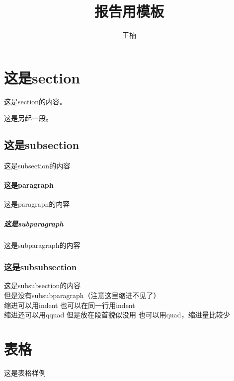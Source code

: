 \documentclass{article} %
\begin{document}
\begin{CJK}{UTF8}{gbsn} %
\renewcommand{\abstractname}{摘 \qquad 要}
\renewcommand{\contentsname}{\center 目\qquad\qquad录}
\renewcommand{\listfigurename}{图 \quad 示 \quad 目 \quad 录}
\renewcommand{\listtablename}{表 \quad 格 \quad 目 \quad 录}
\renewcommand{\appendixname}{附录}
\renewcommand{\refname}{\center 参 \quad 考 \quad 文 \quad 献}
\renewcommand{\indexname}{\center 索 \qquad 引}
\renewcommand{\figurename}{图}
\renewcommand{\tablename}{表}

\title{报告用模板} %
\author{王楠} %
\maketitle %
\tableofcontents %
\section{这是section}
这是section的内容。

这是另起一段。 %
\subsection{这是subsection}
这是subsection的内容
\paragraph{这是paragraph}
这是paragraph的内容
\subparagraph{这是subparagraph}
这是subparagraph的内容
\subsubsection{这是subsubsection}
这是subsubsection的内容\\%
但是没有subsubparagraph（注意这里缩进不见了）\\
\indent 缩进可以用indent \indent 也可以在同一行用indent\\
\indent 缩进还可以用qquad \qquad 但是放在段首貌似没用 \quad 也可以用quad，缩进量比较少

\section{表格}
这是表格样例


\end{CJK}
\end{document}
